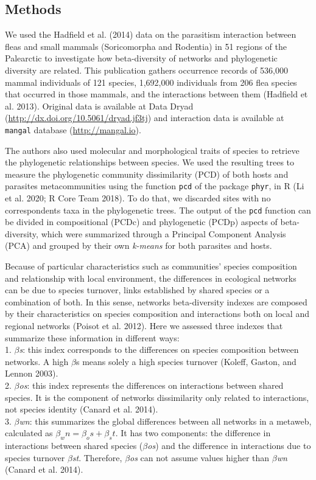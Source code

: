 \documentclass[12pt]{article}
\begin{document}
\hypertarget{methods}{%
\subsection{Methods}\label{methods}}

We used the Hadfield et al. (2014) data on the parasitism interaction
between fleas and small mammals (Soricomorpha and Rodentia) in 51
regions of the Palearctic to investigate how beta-diversity of networks
and phylogenetic diversity are related. This publication gathers
occurrence records of 536,000 mammal individuals of 121 species,
1,692,000 individuals from 206 flea species that occurred in those
mammals, and the interactions between them (Hadfield et al. 2013).
Original data is available at Data Dryad
(\url{http://dx.doi.org/10.5061/dryad.jf3tj}) and interaction data is
available at \texttt{mangal} database (\url{http://mangal.io}).

The authors also used molecular and morphological traits of species to
retrieve the phylogenetic relationships between species. We used the
resulting trees to measure the phylogenetic community dissimilarity
(PCD) of both hosts and parasites metacommunities using the function
\texttt{pcd} of the package \texttt{phyr}, in R (Li et al. 2020; R Core
Team 2018). To do that, we discarded sites with no correspondents taxa
in the phylogenetic trees. The output of the \texttt{pcd} function can
be divided in compositional (PCDc) and phylogenetic (PCDp) aspects of
beta-diversity, which were summarized through a Principal Component
Analysis (PCA) and grouped by their own \emph{k-means} for both
parasites and hosts.

Because of particular characteristics such as communities' species
composition and relationship with local environment, the differences in
ecological networks can be due to species turnover, links established by
shared species or a combination of both. In this sense, networks
beta-diversity indexes are composed by their characteristics on species
composition and interactions both on local and regional networks (Poisot
et al. 2012). Here we assessed three indexes that summarize these
information in different ways:\\
1. \emph{\(\beta\)s}: this index corresponds to the differences on
species composition between networks. A high \(\beta\)s means solely a
high species turnover (Koleff, Gaston, and Lennon 2003).\\
2. \emph{\(\beta\)os}: this index represents the differences on
interactions between shared species. It is the component of networks
dissimilarity only related to interactions, not species identity (Canard
et al. 2014).\\
3. \emph{\(\beta\)wn}: this summarizes the global differences between
all networks in a metaweb, calculated as
\(\beta_wn = \beta_os + \beta_st\). It has two components: the
difference in interactions between shared species (\emph{\(\beta\)os})
and the difference in interactions due to species turnover
\emph{\(\beta\)st}. Therefore, \emph{\(\beta\)os} can not assume values
higher than \emph{\(\beta\)wn} (Canard et al. 2014).
\end{document}
